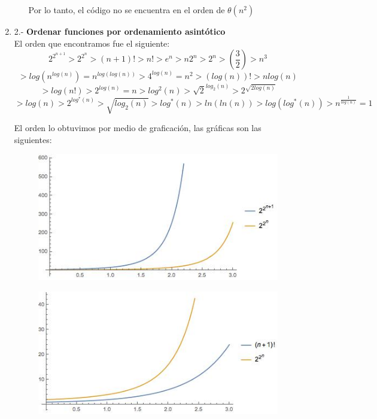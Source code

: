 \documentclass[11 pt, a4paper]{article}
\theoremstyle{definition}
\begin{document}
\begin{enumerate}
\begin{enumerate}
Por lo tanto, el código no se encuentra en el orden de $\theta(n^2)$
 \end{enumerate}
\item 2.- \textbf{Ordenar funciones por ordenamiento asintótico}\\
El orden que encontramos fue el siguiente: 
\[
2^{2^{n+1}} > 2^{2^{n}} > (n+1)! > n! > e^{n} > n2^n > 2^n > \left(\frac{3}{2} \right) > n^3\]
\[>  log (n^{log (n)}) = n^{log(log(n))} > 4^{log(n)} = n^2 > (log(n)) ! > n log(n)\]
\[ > log(n!) > 2^{log(n)} = n > log^2 (n) > \sqrt{2}^{log_2(n)} > 2^{\sqrt{2 log(n)}}\]
\[> log(n) > 2^{log^*(n)} > \sqrt{log_2(n)} > log^*(n) > ln(ln(n)) > log(log^*(n)) > n^{\frac{1}{log(n)}} = 1\]

El orden lo obtuvimos por medio de graficación, las gráficas son las siguientes: 
 \begin{figure}[H]
         \centering
          \includegraphics[trim=0cm 0cm 0cm 0cm, width=12cm]{1.jpg} 
      \end{figure}
 \begin{figure}[H]
         \centering
          \includegraphics[trim=0cm 0cm 0cm 0cm, width=12cm]{2.jpg} 
      \end{figure} \begin{figure}[H]
         \centering

\end{figure}
\end{enumerate}
\end{document}
